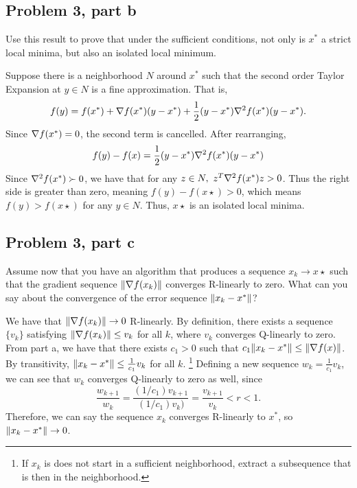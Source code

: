 \subsection{Problem 3, part b}
Use this result to prove that under the sufficient conditions, not only is $x^*$ a strict local minima, but also an isolated local minimum. 
\partbreak
\begin{solution}

    Suppose there is a neighborhood $N$ around $x^*$ such that the second order Taylor Expansion at $y \in N$ is a fine approximation. That is,
    \[f(y) = f(x^*) + \nabla f(x^*)(y - x^*) + \frac{1}{2}(y - x^{*})\nabla ^2f(x^{*})(y - x^{*}).\]
    Since $\nabla f(x^{*}) = 0$, the second term is cancelled. After rearranging, 
    \[f(y) - f(x) = \frac{1}{2}(y - x^{*})\nabla ^2f(x^{*})(y - x^{*})\]
    Since $\nabla^2 f(x^{*}) \succ 0$, we have that for any $z \in N, \ z^T \nabla^2f(x^{*})z > 0$. Thus the right side is greater than zero, meaning $f(y) - f(x\star) > 0$, which means $f(y) > f(x\star)$ for any $y \in N$. Thus, $x\star$ is an isolated local minima.
\end{solution}

\newpage
\subsection{Problem 3, part c}
Assume now that you have an algorithm that produces a sequence $x_k \rightarrow x\star$ such that the gradient sequence $\norm{\nabla f(x_k)}$ converges R-linearly to zero. What can you say about the convergence of the error sequence $\norm{x_k - x^{*}}$? 
\partbreak
\begin{solution}

    We have that $\norm{\nabla f(x_k)} \rightarrow 0$ R-linearly. By definition, there exists a sequence $\{v_k\}$ satisfying $\norm{\nabla f(x_k)} \leq v_k$ for all $k$, where $v_k$ converges Q-linearly to zero. From part a, we have that there exists $c_1 > 0$ such that $c_1 \norm{x_k - x^{*}} \leq \norm{\nabla f(x)}$. By transitivity, $\norm{x_k - x^{*}} \leq \frac{1}{c_1}v_k$ for all $k$. \footnote{If $x_k$ is does not start in a sufficient neighborhood, extract a subsequence that is then in the neighborhood.} Defining a new sequence $w_k = \frac{1}{c_1}v_k$, we can see that $w_k$ converges Q-linearly to zero as well, since 
    \[\frac{w_{k+1}}{w_k} = \frac{(1/c_1)v_{k+1}}{(1/c_1)v_k)} = \frac{v_{k+1}}{v_k} < r < 1.\]
    Therefore, we can say the sequence $x_k$ converges R-linearly to $x^*$, so $\norm{x_k - x^{*}}\rightarrow 0$.
\end{solution}


